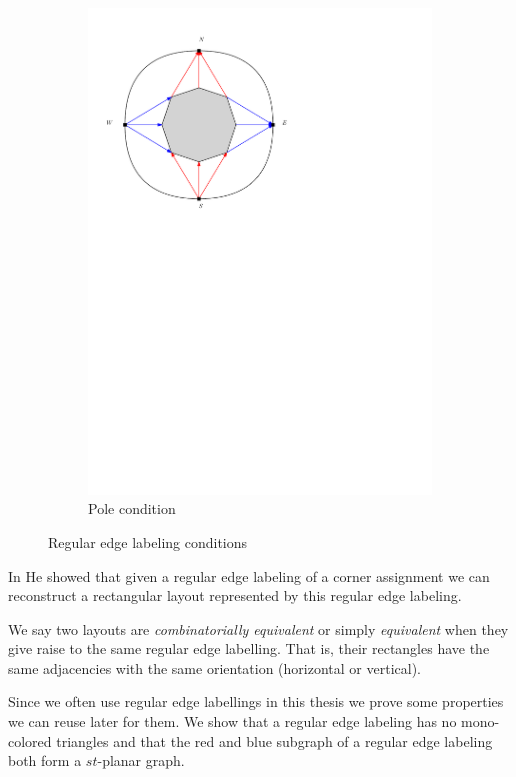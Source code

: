 \begin{figure}
\begin{subfigure}[b]{0.7 \textwidth}
          \includegraphics[width =\textwidth]{rectangularDuals/img/exteriorCondition.pdf}
          \caption{Pole condition}
      \end{subfigure}
      \caption{Regular edge labeling conditions}
  \label{fig:rel:conditions}
  \end{figure}
  In \cite{He1993} He showed that given a regular edge labeling of a corner assignment we can reconstruct a rectangular layout represented by this regular edge labeling.

    We say two layouts are  \emph{combinatorially equivalent} or simply \emph{equivalent} when they give raise to the same regular edge labelling. That is, their rectangles have the same adjacencies with the same orientation (horizontal or vertical).

    Since we often use regular edge labellings in this thesis we prove some properties we can reuse later for them. We show that a regular edge labeling has no mono-colored triangles and that the red and blue subgraph of a regular edge labeling both form a $st$-planar graph.

